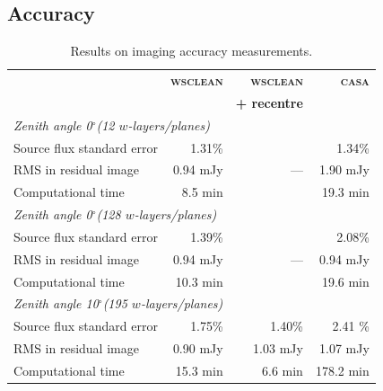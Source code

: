 \documentclass[useAMS,usenatbib]{mn2e}
\newcommand{\degree}{\ensuremath{^{\circ}}\xspace}
\begin{document}
\subsection{Accuracy}
\begin{table}%
\caption{Results on imaging accuracy measurements.} \label{tbl:accuracy-measurements}%
\begin{center}\begin{tabular}{lrrr}%
\hline\hline
& \textbf{\textsc{wsclean}} & \textbf{\textsc{wsclean}}    & \textbf{\textsc{casa}} \\
&                  & \textbf{+ recentre} & \\
\hline
\multicolumn{3}{l}{\textit{Zenith angle 0\degree (12 $w$-layers/planes)}} \\
\hline
Source flux standard error & 1.31\% & & 1.34\% \\
RMS in residual image & 0.94 mJy & --- & 1.90 mJy\\
Computational time & 8.5 min & & 19.3 min\\
\hline
\multicolumn{3}{l}{\textit{Zenith angle 0\degree (128 $w$-layers/planes)}} \\
\hline
Source flux standard error & 1.39\% & & 2.08\% \\
RMS in residual image & 0.94 mJy & --- & 0.94 mJy \\
Computational time & 10.3 min & & 19.6 min \\
\hline
\multicolumn{3}{l}{\textit{Zenith angle 10\degree (195 $w$-layers/planes)}} \\
\hline
Source flux standard error & 1.75\% & 1.40\% & 2.41 \%\\
RMS in residual image & 0.90 mJy & 1.03 mJy & 1.07 mJy \\
Computational time & 15.3 min & 6.6 min & 178.2 min \\
\hline\hline
\end{tabular}\end{center}\end{table}
\end{document}
